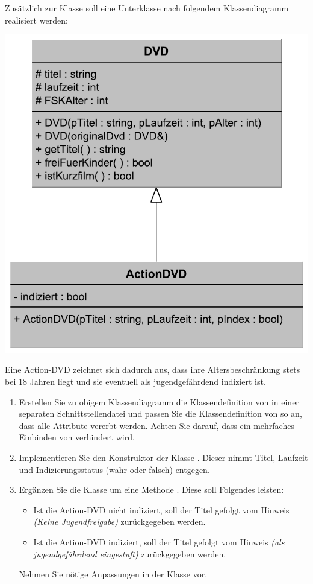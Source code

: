 \newcommand{\setfontsize}{11pt}

\lofoot{}


Zusätzlich zur Klasse  soll eine Unterklasse  nach folgendem Klassendiagramm realisiert werden:
\begin{center}
	\includegraphics[keepaspectratio,scale=0.7]{actiondvd-uml.pdf}
\end{center}

Eine Action-DVD zeichnet sich dadurch aus, dass ihre Altersbeschränkung stets bei 18 Jahren liegt und sie eventuell als jugendgefährdend indiziert ist.
\begin{enumerate}
	\item Erstellen Sie zu obigem Klassendiagramm die Klassendefinition von  in einer separaten Schnittstellendatei  und passen Sie die Klassendefinition von  so an, dass alle Attribute vererbt werden.
	Achten Sie darauf, dass ein mehrfaches Einbinden von  verhindert wird.
	\item Implementieren Sie den Konstruktor der Klasse . Dieser nimmt Titel, Laufzeit und Indizierungsstatus (wahr oder falsch) entgegen.
	\item Ergänzen Sie die Klasse  um eine Methode . Diese soll Folgendes leisten:
	\begin{itemize}
		\item Ist die Action-DVD nicht indiziert, soll der Titel gefolgt vom Hinweis \textit{(Keine Jugendfreigabe)} zurückgegeben werden.
		\item Ist die Action-DVD indiziert, soll der Titel gefolgt vom Hinweis  \textit{(als jugendgefährdend eingestuft)} zurückgegeben werden.
	\end{itemize}
	Nehmen Sie nötige Anpassungen in der Klasse  vor.
\end{enumerate}
